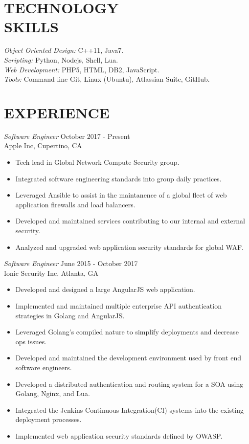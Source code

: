 \documentclass[margin, 10pt]{res} %
\begin{document}
\begin{resume}
\section{TECHNOLOGY \\ SKILLS} 

{\sl Object Oriented Design:} C++11, Java7. \\
{\sl Scripting:} Python, Nodejs, Shell, Lua. \\
{\sl Web Development:} PHP5, HTML, DB2, JavaScript. \\
{\sl Tools:} Command line Git, Linux (Ubuntu), Atlassian Suite, GitHub. \\
 
 
\section{EXPERIENCE}

{\sl Software Engineer} \hfill October 2017 - Present \\
Apple Inc, Cupertino, CA
\begin{itemize}
\item Tech lead in Global Network Compute Security group.
\item Integrated software engineering standards into group daily practices.
\item Leveraged Ansible to assist in the maintanence of a global fleet of web application firewalls and load balancers.
\item Developed and maintained services contributing to our internal and external security.
\item Analyzed and upgraded web application security standards for global WAF.
\end{itemize} 

{\sl Software Engineer} \hfill June 2015 - October 2017 \\
Ionic Security Inc, Atlanta, GA
\begin{itemize}
\item Developed and designed a large AngularJS web application.
\item Implemented and maintained multiple enterprise API authentication strategies in Golang and AngularJS.
\item Leveraged Golang's compiled nature to simplify deployments and decrease ops issues.
\item Developed and maintained the development environment used by front end software engineers.
\item Developed a distributed authentication and routing system for a SOA using Golang, Nginx, and Lua.
\item Integrated the Jenkins Continuous Integration(CI) systems into the existing deployment processes.
\item Implemented web application security standards defined by OWASP.
\end{itemize} 


\end{resume}
\end{document}
